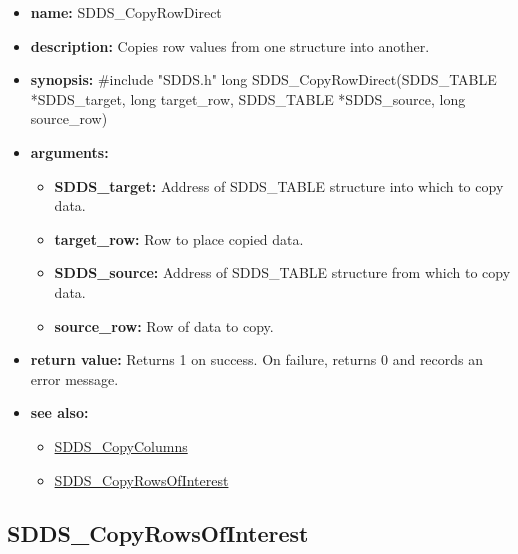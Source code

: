 \documentclass[11pt]{article}
\newcommand{\progref}[1]{\hyperref{SDDS_#1}{{\tt SDDS\_#1} (}{)}{SDDS_#1}}
\begin{document}
\begin{itemize}
\item {\bf name:}\newline
SDDS\_CopyRowDirect
\item {\bf description:}\newline
Copies row values from one structure into another.
\item {\bf synopsis:} \#include "SDDS.h"\newline
long SDDS\_CopyRowDirect(SDDS\_TABLE *SDDS\_target, long target\_row, SDDS\_TABLE *SDDS\_source, long source\_row)
\item {\bf arguments:}
\begin{itemize}
\item {\bf SDDS\_target:} Address of SDDS\_TABLE structure into which to copy data.
\item {\bf target\_row:} Row to place copied data.
\item {\bf SDDS\_source:} Address of SDDS\_TABLE structure from which to copy data.
\item {\bf source\_row:} Row of data to copy.
\end{itemize}
\item {\bf return value:}\newline
Returns 1 on success. On failure, returns 0 and records an error message.
\item {\bf see also:}
\begin{itemize}
\item \progref{CopyColumns}
\item \progref{CopyRowsOfInterest}
\end{itemize}
\end{itemize}

\subsection{SDDS\_CopyRowsOfInterest}
\label{SDDS_CopyRowsOfInterest}
\end{document}
